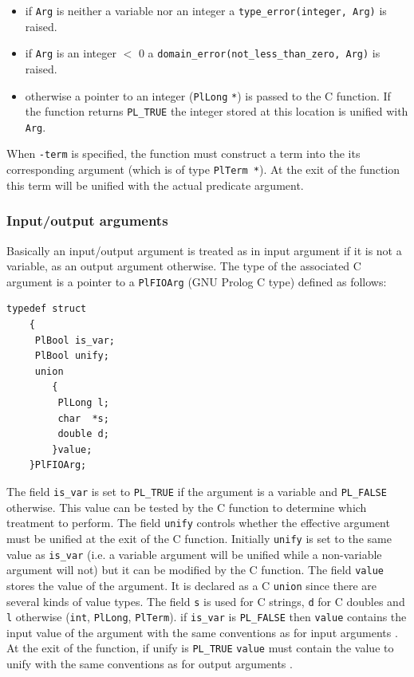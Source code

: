 \begin{itemize}

\item if \texttt{Arg} is neither a variable nor an integer a
\texttt{type\_error(integer, Arg)} is raised.

\item if \texttt{Arg} is an integer $<$ 0 a
\texttt{domain\_error(not\_less\_than\_zero, Arg)} is raised.

\item otherwise a pointer to an integer (\texttt{PlLong} \texttt{*}) is passed
to the C function. If the function returns \texttt{PL\_TRUE} the integer stored
at this location is unified with \texttt{Arg}.

\end{itemize}

When \texttt{-term} is specified, the function must construct a term into
the its corresponding argument (which is of type \texttt{PlTerm *}). At the
exit of the function this term will be unified with the actual predicate
argument.

\subsubsection{Input/output arguments}
\label{Input/output-arguments}
Basically an input/output argument is treated as in input argument if it is
not a variable, as an output argument otherwise. The type of the associated
C argument is a pointer to a \texttt{PlFIOArg} (GNU Prolog C type) defined as
follows:

\begin{Code}
\begin{verbatim}
typedef struct
    {
     PlBool is_var;
     PlBool unify;
     union
        {
         PlLong l;
         char  *s;
         double d;
        }value;
    }PlFIOArg;
\end{verbatim}
\end{Code}

The field \texttt{is\_var} is set to \texttt{PL\_TRUE} if the argument is a
variable and \texttt{PL\_FALSE} otherwise. This value can be tested by the C
function to determine which treatment to perform. The field \texttt{unify}
controls whether the effective argument must be unified at the exit of the C
function. Initially \texttt{unify} is set to the same value as
\texttt{is\_var} (i.e. a variable argument will be unified while a
non-variable argument will not) but it can be modified by the C function.
The field \texttt{value} stores the value of the argument. It is declared as
a C \texttt{union} since there are several kinds of value types. The field
\texttt{s} is used for C strings, \texttt{d} for C doubles and \texttt{l}
otherwise (\texttt{int}, \texttt{PlLong}, \texttt{PlTerm}). if \texttt{is\_var}
is \texttt{PL\_FALSE} then \texttt{value} contains the input value of the
argument with the same conventions as for input arguments
.  At the exit of the function, if unify is
\texttt{PL\_TRUE} \texttt{value} must contain the value to unify with the same
conventions as for output arguments
.

